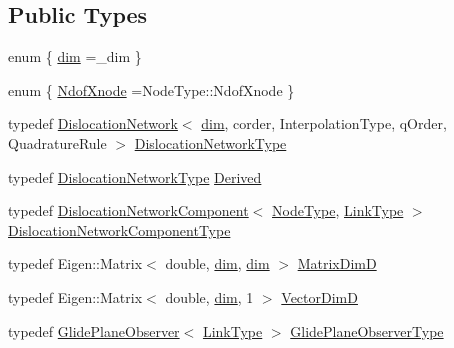 \subsection*{Public Types}
\begin{DoxyCompactItemize}
\item 
enum \{ \hyperlink{classmodel_1_1_dislocation_network_acc72ad5cadfe616bf9a84a64c77a4194aa094f91064b6826bd0d38c0a82dd5196}{dim} =\+\_\+dim
 \}
\item 
enum \{ \hyperlink{classmodel_1_1_dislocation_network_aaca8a960ed677d30699d7473fa964b40a9d384aadc7031c7c9ca7149f91e563cb}{Ndof\+Xnode} =Node\+Type\+:\+:Ndof\+Xnode
 \}
\item 
typedef \hyperlink{classmodel_1_1_dislocation_network}{Dislocation\+Network}$<$ \hyperlink{classmodel_1_1_dislocation_network_acc72ad5cadfe616bf9a84a64c77a4194aa094f91064b6826bd0d38c0a82dd5196}{dim}, corder, Interpolation\+Type, q\+Order, Quadrature\+Rule $>$ \hyperlink{classmodel_1_1_dislocation_network_a0bfe40fefef57755aaa4b5071f503cff}{Dislocation\+Network\+Type}
\item 
typedef \hyperlink{classmodel_1_1_dislocation_network_a0bfe40fefef57755aaa4b5071f503cff}{Dislocation\+Network\+Type} \hyperlink{classmodel_1_1_dislocation_network_a9c684e15a7dbae0ab13dbfdb5c76e81c}{Derived}
\item 
typedef \hyperlink{classmodel_1_1_dislocation_network_component}{Dislocation\+Network\+Component}$<$ \hyperlink{_network_typedefs_8h_a723f680c66f6a92647827790bcbafce0}{Node\+Type}, \hyperlink{_spline_node_base__corder0_8h_ab09ccc0af6ea9402dfef7b0eac55cff3}{Link\+Type} $>$ \hyperlink{classmodel_1_1_dislocation_network_a9e5b5e52a5d6d20a40ee88a74cf0cc7f}{Dislocation\+Network\+Component\+Type}
\item 
typedef Eigen\+::\+Matrix$<$ double, \hyperlink{classmodel_1_1_dislocation_network_acc72ad5cadfe616bf9a84a64c77a4194aa094f91064b6826bd0d38c0a82dd5196}{dim}, \hyperlink{classmodel_1_1_dislocation_network_acc72ad5cadfe616bf9a84a64c77a4194aa094f91064b6826bd0d38c0a82dd5196}{dim} $>$ \hyperlink{classmodel_1_1_dislocation_network_a9660c892fa8d51215f776fc13f073502}{Matrix\+Dim\+D}
\item 
typedef Eigen\+::\+Matrix$<$ double, \hyperlink{classmodel_1_1_dislocation_network_acc72ad5cadfe616bf9a84a64c77a4194aa094f91064b6826bd0d38c0a82dd5196}{dim}, 1 $>$ \hyperlink{classmodel_1_1_dislocation_network_a2825fa02c2f77fd9a08e3b9a2207cb00}{Vector\+Dim\+D}
\item 
typedef \hyperlink{structmodel_1_1_glide_plane_observer}{Glide\+Plane\+Observer}$<$ \hyperlink{_spline_node_base__corder0_8h_ab09ccc0af6ea9402dfef7b0eac55cff3}{Link\+Type} $>$ \hyperlink{classmodel_1_1_dislocation_network_a165910ccdf54b1bb2956b669a75cea2a}{Glide\+Plane\+Observer\+Type}

\end{DoxyCompactItemize}
